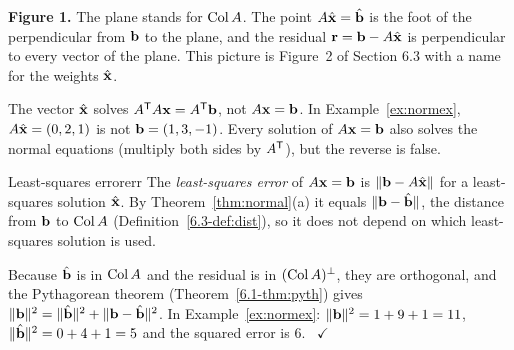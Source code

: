 \documentclass[11pt]{article}
\begin{document}
\begin{center}
\end{center}

\noindent\textbf{Figure 1.} The plane stands for $\operatorname{Col} A$. The point $A\hat{\mathbf{x}}=\hat{\mathbf{b}}$ is the foot of the perpendicular from $\mathbf{b}$ to the plane, and the residual $\mathbf{r}=\mathbf{b}-A\hat{\mathbf{x}}$ is perpendicular to every vector of the plane. This picture is Figure~2 of Section 6.3 with a name for the weights $\hat{\mathbf{x}}$.

\begin{warn}
The vector $\hat{\mathbf{x}}$ solves $A^{\mathsf T} A\mathbf{x}=A^{\mathsf T}\mathbf{b}$, not $A\mathbf{x}=\mathbf{b}$. In Example~\ref{ex:normex}, $A\hat{\mathbf{x}}=(0,2,1)$ is not $\mathbf{b}=(1,3,-1)$. Every solution of $A\mathbf{x}=\mathbf{b}$ also solves the normal equations (multiply both sides by $A^{\mathsf T}$), but the reverse is false.
\end{warn}

\begin{defn}{Least-squares error}{err}
The \emph{least-squares error} of $A\mathbf{x}=\mathbf{b}$ is $\lVert\mathbf{b}-A\hat{\mathbf{x}}\rVert$ for a least-squares solution $\hat{\mathbf{x}}$. By Theorem~\ref{thm:normal}(a) it equals $\lVert\mathbf{b}-\hat{\mathbf{b}}\rVert$, the distance from $\mathbf{b}$ to $\operatorname{Col} A$ (Definition~\ref{6.3-def:dist}), so it does not depend on which least-squares solution is used.
\end{defn}

Because $\hat{\mathbf{b}}$ is in $\operatorname{Col} A$ and the residual is in $(\operatorname{Col} A)^{\perp}$, they are orthogonal, and the Pythagorean theorem (Theorem~\ref{6.1-thm:pyth}) gives $\lVert\mathbf{b}\rVert^2=\lVert\hat{\mathbf{b}}\rVert^2+\lVert\mathbf{b}-\hat{\mathbf{b}}\rVert^2$. In Example~\ref{ex:normex}: $\lVert\mathbf{b}\rVert^2=1+9+1=11$, $\lVert\hat{\mathbf{b}}\rVert^2=0+4+1=5$ and the squared error is $6$. \ $\checkmark$
\end{document}
